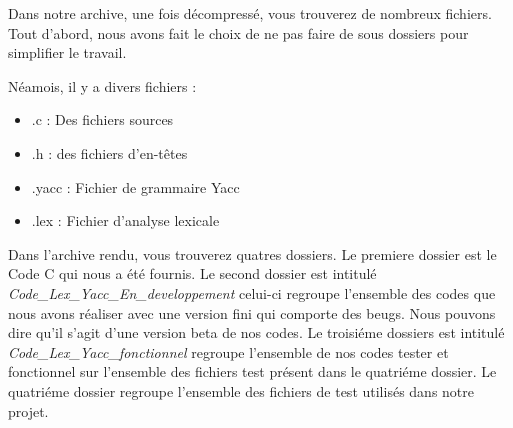 Dans notre archive, une fois décompressé, vous trouverez de nombreux fichiers.
Tout d'abord, nous avons fait le choix de ne pas faire de sous dossiers pour simplifier le travail.

Néamois, il y a divers fichiers : 
\begin{itemize}
    \item .c : Des fichiers sources
    \item .h : des fichiers d'en-têtes
    \item .yacc : Fichier de grammaire Yacc
    \item .lex : Fichier d'analyse lexicale

\end{itemize}

Dans l'archive rendu, vous trouverez quatres dossiers.
Le premiere dossier est le Code C qui nous a été fournis. Le second dossier est intitulé \textit{Code\_Lex\_Yacc\_En\_developpement} celui-ci regroupe l'ensemble des codes que nous avons réaliser avec une version fini qui comporte des beugs. Nous pouvons dire qu'il s'agit d'une version beta de nos codes. Le troisiéme dossiers est intitulé \textit{Code\_Lex\_Yacc\_fonctionnel} regroupe l'ensemble de nos codes tester et fonctionnel sur l'ensemble des fichiers test présent dans le quatriéme dossier. Le quatriéme dossier regroupe l'ensemble des fichiers de test utilisés dans notre projet. 